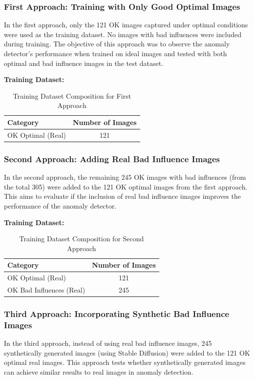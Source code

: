 \documentclass[12pt,DIV14,BCOR12mm,a4paper,footinclude=false,headinclude,parskip=half-,twoside,openright,cleardoublepage=empty,toc=index,bibliography=totoc,listof=totoc]{scrreprt}
\numberwithin{equation}{chapter}
\begin{document}
\subsubsection{First Approach: Training with Only Good Optimal Images}
In the first approach, only the 121 OK images captured under optimal conditions were used as the training dataset. No images with bad influences were included during training. The objective of this approach was to observe the anomaly detector’s performance when trained on ideal images and tested with both optimal and bad influence images in the test dataset.

\textbf{Training Dataset:}
\begin{table}
    \centering
    \caption{Training Dataset Composition for First Approach}
    \label{tab:first-approach}
    \begin{tabular}{lc} %
        \toprule
        \textbf{Category} & \textbf{Number of Images} \\ 
        \midrule
        OK Optimal (Real) & 121 \\ 
        \bottomrule
    \end{tabular}
\end{table}

\subsubsection{Second Approach: Adding Real Bad Influence Images}
In the second approach, the remaining 245 OK images with bad influences (from the total 305) were added to the 121 OK optimal images from the first approach. This aims to evaluate if the inclusion of real bad influence images improves the performance of the anomaly detector.

\textbf{Training Dataset:}
\begin{table} 
    \centering
    \caption{Training Dataset Composition for Second Approach}
    \label{tab:second-approach}
    \begin{tabular}{lc} %
        \toprule
        \textbf{Category} & \textbf{Number of Images} \\ 
        \midrule
        OK Optimal (Real) & 121 \\ 
        OK Bad Influences (Real) & 245 \\ 
        \bottomrule
    \end{tabular}
\end{table}


\subsubsection{Third Approach: Incorporating Synthetic Bad Influence Images}
In the third approach, instead of using real bad influence images, 245 synthetically generated images (using Stable Diffusion) were added to the 121 OK optimal real images. This approach tests whether synthetically generated images can achieve similar results to real images in anomaly detection.
\end{document}
